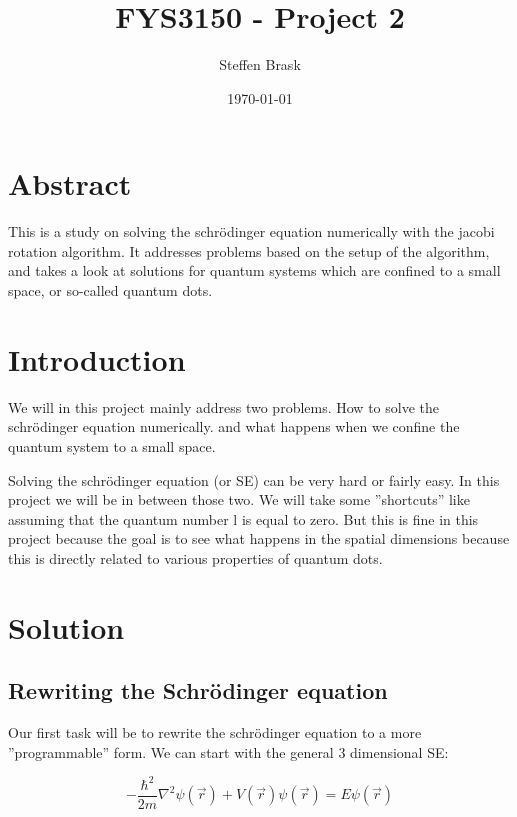 \documentclass[norsk,a4paper,12pt]{article}
\title{FYS3150 - Project 2}
\author{Steffen Brask}
\date{\today}
\begin{document}
\maketitle



\newpage


\section*{Abstract}

This is a study on solving the schrödinger equation numerically with the jacobi rotation algorithm.
It addresses problems based on the setup of the algorithm, and takes a look at solutions for quantum systems
which are confined to a small space, or so-called quantum dots.

\section*{Introduction}

We will in this project mainly address two problems. How to solve the schrödinger equation numerically. and what happens when we
confine the quantum system to a small space.

Solving the schrödinger equation (or SE) can be very hard or fairly easy. In this project we will be in between those two.
We will take some ''shortcuts'' like assuming that the quantum number l is equal to zero. But this is fine in this project because
the goal is to see what happens in the spatial dimensions because this is directly related to various properties of quantum dots.


\section*{Solution}

\subsection*{Rewriting the Schrödinger equation}

Our first task will be to rewrite the schrödinger equation to a more ''programmable'' form.
We can start with the general 3 dimensional SE:

\begin{equation}
 -\frac{\hbar^2}{2m}\nabla^2\psi(\vec{r}) + V(\vec{r})\psi(\vec{r}) = E\psi(\vec{r})
\end{equation}
\end{document}
